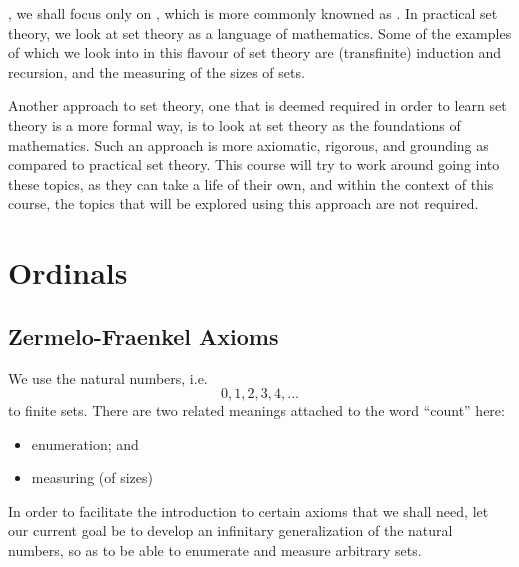 \documentclass[notoc,notitlepage]{tufte-book}
\begin{document}
, we shall focus only on , which is more commonly knowned as . In practical set theory, we look at set theory as a language of mathematics. Some of the examples of which we look into in this flavour of set theory are (transfinite) induction and recursion, and the measuring of the sizes of sets.

Another approach to set theory, one that is deemed required in order to learn set theory is a more formal way, is to look at set theory as the foundations of mathematics. Such an approach is more axiomatic, rigorous, and grounding as compared to practical set theory. This course will try to work around going into these topics, as they can take a life of their own, and within the context of this course, the topics that will be explored using this approach are not required.


\section{Ordinals}%
\label{sec:ordinals}

\subsection{Zermelo-Fraenkel Axioms}%
\label{sub:zermelo_fraenkel_axioms}

We use the natural numbers, i.e.
\begin{equation*}
  0, 1, 2, 3, 4, ...
\end{equation*}
to  finite sets. There are two related meanings attached to the word ``count'' here:
\begin{itemize}
  \item enumeration; and
  \item measuring (of sizes)
\end{itemize}

In order to facilitate the introduction to certain axioms that we shall need, let our current goal be to develop an infinitary generalization of the natural numbers, so as to be able to enumerate and measure arbitrary sets.
\end{document}
